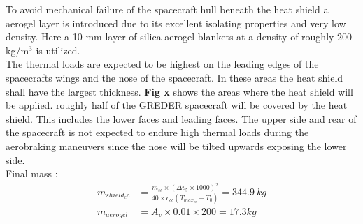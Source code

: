 To avoid mechanical failure of the spacecraft hull beneath the heat shield a aerogel layer is introduced due to its excellent isolating properties and very low density. Here a 10 mm layer of silica aerogel blankets at a density of roughly $20$0 kg/m$^3$ is utilized. \\

The thermal loads are expected to be highest on the leading edges of the spacecrafts wings and the nose of the spacecraft. In these areas the heat shield shall have the largest thickness. \textbf{Fig x} shows the areas where the heat shield will be applied. roughly half of the GREDER spacecraft will be covered by the heat shield. This includes the lower faces and leading faces. The upper side and rear of the spacecraft is not expected to endure high thermal loads during the aerobraking maneuvers since the nose will be tilted upwards exposing the lower side.\\

Final mass :
\begin{align}
	m_{shield_cc} &= \frac{m_{sc} \times (\Delta v_5\times 1000)^2}{40\times c_{cc}(T_{max_{cc}}-T_0)} = 344.9\ kg\\
	m_{aerogel} &= A_v\times 0.01\times 200 = 17.3kg
\end{align}